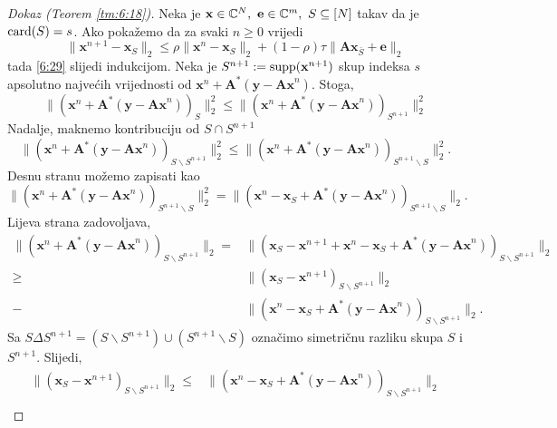 \documentclass[a4paper,twoside,12pt]{memoir} %
\newcommand{\vect}[1]{\mathbf{#1}}
\renewcommand{\vec}{\vect}
\newcommand{\card}{\text{\normalfont{card}}}
\newcommand{\supp}{\text{\normalfont{supp}}}
\newcommand{\norm}[1]{\|{#1}\|}
\begin{document}
\begin{proof}[Dokaz (Teorem \ref{tm:6:18})]
    Neka je $\vec x \in \C^N,\ \vec e \in \C^m,\ S \subseteq [N]$ takav da je $\card(S) = s$. Ako poka\v{z}emo da za svaki $n \geq 0$ vrijedi
    \begin{equation}\label{6:30}
        \norm{\vec x^{n+1} - \vec x_S}_2 \leq \rho \norm{\vec x^n - \vec x_S}_2 + (1-\rho)\tau \norm{\vec{Ax}_{\bar S} + \vec e}_2 
    \end{equation}
    tada \eqref{6:29} slijedi indukcijom. Neka je $S^{n+1} := \supp(\vec x^{n+1})$ skup indeksa $s$ apsolutno najve\'cih vrijednosti od $\vec x^n + \vec A^*(\vec y - \vec{Ax}^n)$. Stoga,
    \begin{equation*}
        \norm{(\vec x^n + \vec A^* (\vec y - \vec{Ax}^n))_S}_2^2 \leq \norm{(\vec x^n + \vec A^* (\vec y - \vec{Ax}^n))_{S^{n+1}}}_2^2
    \end{equation*}
    Nadalje, maknemo kontribuciju od $S \cap S^{n+1}$
    \begin{equation*}
        \norm{(\vec x^n + \vec A^* (\vec y - \vec{Ax}^n))_{S \backslash S^{n+1}}}_2^2 \leq \norm{(\vec x^n + \vec A^* (\vec y - \vec{Ax}^n))_{S^{n+1} \backslash S}}_2^2.
    \end{equation*}
    Desnu stranu mo\v{z}emo zapisati kao
    \begin{equation*}
        \norm{(\vec x^n + \vec A^* (\vec y - \vec{Ax}^n))_{S^{n+1} \backslash S}}_2^2 = \norm{(\vec x^n - \vec x_S + \vec A^* (\vec y - \vec{Ax}^n))_{S^{n+1} \backslash S}}_2.
    \end{equation*}
    Lijeva strana zadovoljava,
    \begin{align*}
        \norm{(\vec x^n + \vec A^*(\vec y - \vec{Ax}^n))_{S \backslash S^{n+1}}}_2 = &\norm{(\vec x_S - \vec x^{n+1} + \vec x^n - \vec x_S + \vec A^*(\vec y - \vec{Ax}^n))_{S \backslash S^{n+1}}}_2\\
        \geq &\norm{(\vec x_S - \vec x^{n+1})_{S \backslash S^{n+1}}}_2\\ - & \norm{(\vec x^n - \vec x_S + \vec A^*(\vec y - \vec {Ax}^n))_{S \backslash S^{n+1}}}_2.
    \end{align*}
    Sa $S \Delta S^{n+1} = (S \backslash S^{n+1}) \cup (S^{n+1} \backslash S)$ ozna\v{c}imo simetri\v{c}nu razliku skupa $S$ i $S^{n+1}$. Slijedi,
    \begin{align}
        \norm{(\vec x_S - \vec x^{n+1})_{S \backslash S^{n+1}}}_2 \leq & \norm{(\vec x^n - \vec x_S + \vec A^*(\vec y - \vec{Ax}^n))_{S \backslash S^{n+1}}}_2 \nonumber \\

\end{align}
\end{proof}
\end{document}
